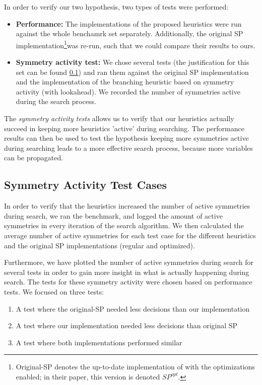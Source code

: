 
In order to verify our two hypothesis, two types of tests were performed:

\begin{itemize}
	\item {\bf Performance:}
		The implementations of the proposed heuristics were run against the whole
		benchamrk set separately.
		Additionally, the original SP implementation\footnote{
			Original-SP denotes the up-to-date implementation of \cite{devriendt2012symmetry} with
			the optimizations enabled; in their paper, this version is denoted $SP^{opt}$.
		}was re-run, such that we could compare their
		results to ours.

	\item {\bf Symmetry activity test:}
		We chose several tests (the justification for this set can be found
		\ref{ssec:sym_act_test_cases}) and ran them against the original SP implementation and the
		implementation of the branching heuristic based on symmetry activity (with lookahead).
		We recorded the number of symmetries active during the search process.

\end{itemize}

The \emph{symmetry activity tests} allows us to verify that our heuristics actually succeed in
keeping more heuristics 'active' during searching.
The performance results can then be used to test the hypothesis
keeping more symmetries active during searching leads to a more effective search process,
because more variables can be propagated.

\subsection{Symmetry Activity Test Cases}
\label{ssec:sym_act_test_cases}
	In order to verify that the heuristics increased the number of active symmetries during search,
	we ran the benchmark, and logged the amount of active symmetries in every iteration of the
	search algorithm.
	We then calculated the average number of active symmetries for each test case for the different
	heuristics and the original SP implementations (regular and optimized).

	Furthermore, we have plotted the number of active symmetries during search for several tests in
	order to gain more insight in what is actually happening during search.
	The tests for these symmetry activity were chosen based on performance tests.
	We focused on three tests:
	\begin{enumerate}
		\item A test where the original-SP needed less decisions than our implementation
		\item A test where our implementation needed less decisions than original SP
		\item A test where both implementations performed similar
	\end{enumerate}


